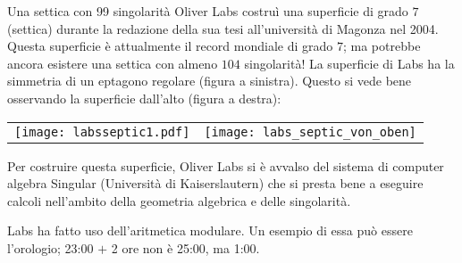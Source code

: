 \begin{surferPage}{Una settica con 99 singolarit\`a}
    Oliver Labs costru\`i una superficie di grado $7$ (settica) durante la redazione della sua
    tesi all'universit\`a di Magonza nel 2004. Questa superficie \`e attualmente il record mondiale di grado $7$; ma potrebbe ancora esistere una settica con almeno $104$
    singolarit\`a!  
    La superficie di Labs ha la simmetria di un eptagono regolare (figura a sinistra).
    Questo si vede bene osservando la superficie dall'alto (figura a destra):

    \vspace*{-0.3em}
    \begin{center}
      \begin{tabular}{c@{\qquad}c}
        \texttt{[image: labsseptic1.pdf]}
        &
        \texttt{[image: labs\_septic\_von\_oben]}
      \end{tabular}
    \end{center}
    \vspace*{-0.3em}

    Per costruire questa superficie, Oliver Labs si \`e avvalso del sistema di computer algebra
    {\sc Singular} (Universit\`a di Kaiserslautern) che si presta bene a eseguire calcoli nell'ambito della geometria algebrica e delle singolarit\`a.

    Labs ha fatto uso dell'aritmetica modulare. Un esempio di essa pu\`o essere l'orologio; 23:00 $+$ 2 ore non
    \`e 25:00, ma 1:00.
\end{surferPage}
